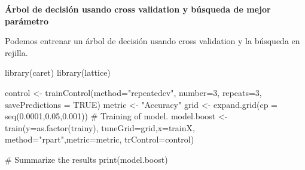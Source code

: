 \documentclass[
]{article}
\newenvironment{Shaded}{\begin{snugshade}}{\end{snugshade}}
\newcommand{\CommentTok}[1]{\textcolor[rgb]{0.50,0.62,0.50}{#1}}
\newcommand{\DataTypeTok}[1]{\textcolor[rgb]{0.87,0.87,0.75}{#1}}
\newcommand{\DecValTok}[1]{\textcolor[rgb]{0.86,0.86,0.80}{#1}}
\newcommand{\FloatTok}[1]{\textcolor[rgb]{0.75,0.75,0.82}{#1}}
\newcommand{\KeywordTok}[1]{\textcolor[rgb]{0.94,0.87,0.69}{#1}}
\newcommand{\NormalTok}[1]{\textcolor[rgb]{0.80,0.80,0.80}{#1}}
\newcommand{\OtherTok}[1]{\textcolor[rgb]{0.94,0.94,0.56}{#1}}
\newcommand{\StringTok}[1]{\textcolor[rgb]{0.80,0.58,0.58}{#1}}
\begin{document}
\textbf{Árbol de decisión usando cross validation y búsqueda de mejor
parámetro}

Podemos entrenar un árbol de decisión usando cross validation y la
búsqueda en rejilla.

\begin{Shaded}
\begin{Highlighting}[]
\KeywordTok{library}\NormalTok{(caret)}
\KeywordTok{library}\NormalTok{(lattice)}

\NormalTok{control <-}\StringTok{  }\KeywordTok{trainControl}\NormalTok{(}\DataTypeTok{method=}\StringTok{"repeatedcv"}\NormalTok{, }\DataTypeTok{number=}\DecValTok{3}\NormalTok{, }\DataTypeTok{repeats=}\DecValTok{3}\NormalTok{, }\DataTypeTok{savePredictions =} \OtherTok{TRUE}\NormalTok{)}
\NormalTok{metric <-}\StringTok{ "Accuracy"}
\NormalTok{grid <-}\StringTok{ }\KeywordTok{expand.grid}\NormalTok{(}\DataTypeTok{cp =} \KeywordTok{seq}\NormalTok{(}\FloatTok{0.0001}\NormalTok{,}\FloatTok{0.05}\NormalTok{,}\FloatTok{0.001}\NormalTok{))}
\CommentTok{# Training of model.}
\NormalTok{model.boost <-}\StringTok{ }\KeywordTok{train}\NormalTok{(}\DataTypeTok{y=}\KeywordTok{as.factor}\NormalTok{(trainy), }\DataTypeTok{tuneGrid=}\NormalTok{grid,}\DataTypeTok{x=}\NormalTok{trainX, }\DataTypeTok{method=}\StringTok{"rpart"}\NormalTok{,}\DataTypeTok{metric=}\NormalTok{metric, }\DataTypeTok{trControl=}\NormalTok{control)}

\CommentTok{# Summarize the results}
\KeywordTok{print}\NormalTok{(model.boost)}
\end{Highlighting}
\end{Shaded}
\end{document}
